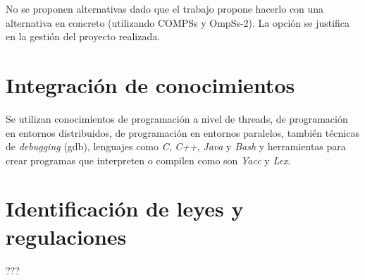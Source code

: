 No se proponen alternativas dado que el trabajo propone hacerlo con una alternativa en concreto (utilizando COMPSs y OmpSs-2). La opción se justifica en la gestión del proyecto realizada.

\section{Integración de conocimientos}

Se utilizan conocimientos de programación a nivel de threads, de programación en entornos distribuidos, de programación en entornos paralelos, también técnicas de \textit{debugging} (gdb), lenguajes como \textit{C}, \textit{C++}, \textit{Java} y \textit{Bash} y herramientas para crear programas que interpreten o compilen como son \textit{Yacc} y \textit{Lex}.

\section{Identificación de leyes y regulaciones}

???
